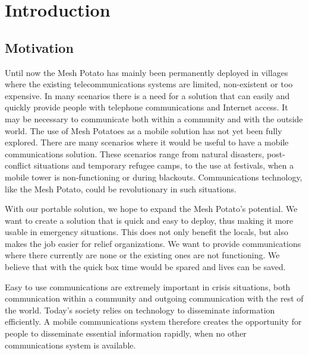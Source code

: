 \chapter{Introduction}
\label{chp:introduction} 

\section{Motivation}
Until now the Mesh Potato has mainly been permanently deployed in villages where the existing telecommunications systems are limited, non-existent or too expensive. In many scenarios there is a need for a solution that can easily and quickly provide people with telephone communications and Internet access. It may be necessary to communicate both within a community and with the outside world. The use of Mesh Potatoes as a mobile solution has not yet been fully explored. There are many scenarios where it would be useful to have a mobile communications solution. These scenarios range from natural disasters, post-conflict situations and temporary refugee camps, to the use at festivals, when a mobile tower is non-functioning or during blackouts. Communications technology, like the Mesh Potato, could be revolutionary in such situations. 

With our portable solution, we hope to expand the Mesh Potato's potential. We want to create a solution that is quick and easy to deploy, thus making it more usable in emergency situations. This does not only benefit the locals, but also makes the job easier for relief organizations. We want to provide communications where there currently are none or the existing ones are not functioning. We believe that with the \gls{quick} box time would be spared and lives can be saved. 

Easy to use communications are extremely important in crisis situations, both communication within a community and outgoing communication with the rest of the world. Today's society relies on technology to disseminate information efficiently. A mobile communications system therefore creates the opportunity for people to disseminate essential information rapidly, when no other communications system is available. 


